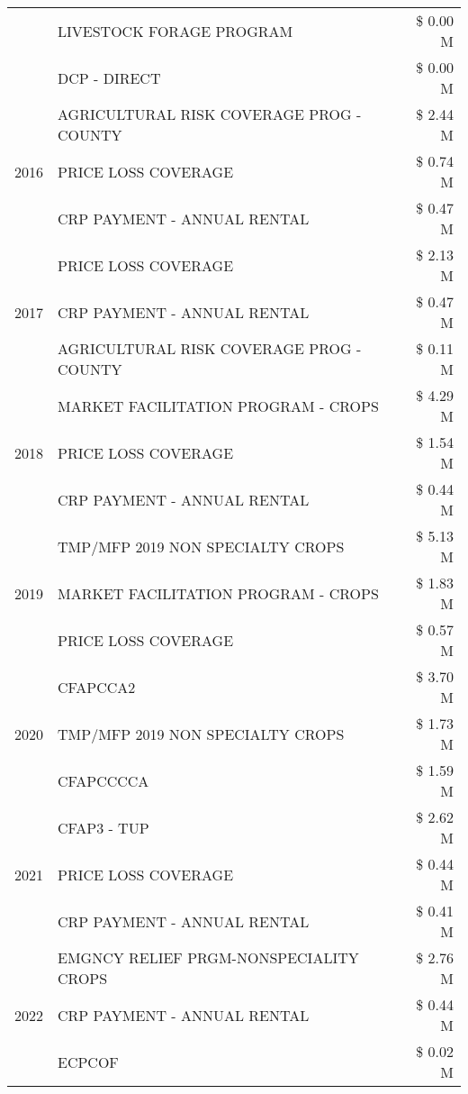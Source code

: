 \begin{tabular}{llr}
 & LIVESTOCK FORAGE PROGRAM & \$ 0.00 M \\
 & DCP - DIRECT & \$ 0.00 M \\
\cline{1-3}
\multirow[t]{3}{*}{2016} & AGRICULTURAL RISK COVERAGE PROG - COUNTY & \$ 2.44 M \\
 & PRICE LOSS COVERAGE & \$ 0.74 M \\
 & CRP PAYMENT - ANNUAL RENTAL & \$ 0.47 M \\
\cline{1-3}
\multirow[t]{3}{*}{2017} & PRICE LOSS COVERAGE & \$ 2.13 M \\
 & CRP PAYMENT - ANNUAL RENTAL & \$ 0.47 M \\
 & AGRICULTURAL RISK COVERAGE PROG - COUNTY & \$ 0.11 M \\
\cline{1-3}
\multirow[t]{3}{*}{2018} & MARKET FACILITATION PROGRAM - CROPS & \$ 4.29 M \\
 & PRICE LOSS COVERAGE & \$ 1.54 M \\
 & CRP PAYMENT - ANNUAL RENTAL & \$ 0.44 M \\
\cline{1-3}
\multirow[t]{3}{*}{2019} & TMP/MFP 2019 NON SPECIALTY CROPS & \$ 5.13 M \\
 & MARKET FACILITATION PROGRAM - CROPS & \$ 1.83 M \\
 & PRICE LOSS COVERAGE & \$ 0.57 M \\
\cline{1-3}
\multirow[t]{3}{*}{2020} & CFAPCCA2 & \$ 3.70 M \\
 & TMP/MFP 2019 NON SPECIALTY CROPS & \$ 1.73 M \\
 & CFAPCCCCA & \$ 1.59 M \\
\cline{1-3}
\multirow[t]{3}{*}{2021} & CFAP3 - TUP & \$ 2.62 M \\
 & PRICE LOSS COVERAGE & \$ 0.44 M \\
 & CRP PAYMENT - ANNUAL RENTAL & \$ 0.41 M \\
\cline{1-3}
\multirow[t]{3}{*}{2022} & EMGNCY RELIEF PRGM-NONSPECIALITY CROPS & \$ 2.76 M \\
 & CRP PAYMENT - ANNUAL RENTAL & \$ 0.44 M \\
 & ECPCOF & \$ 0.02 M \\
\cline{1-3}
\bottomrule
\end{tabular}
